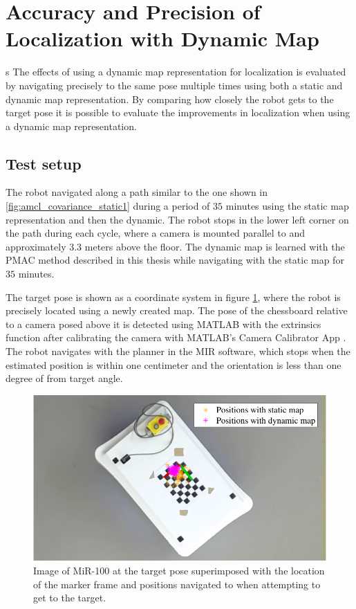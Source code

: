 \section{Accuracy and Precision of Localization with Dynamic Map}s
The effects of using a dynamic map representation for localization is evaluated by navigating precisely to the same pose multiple times using both a static and dynamic map representation.
By comparing how closely the robot gets to the target pose it is possible to evaluate the improvements in localization when using a dynamic map representation. 
\subsection{Test setup} 
The robot navigated along a path similar to the one shown in \ref{fig:amcl_covariance_static1} during a period of $35$ minutes using the static map representation and then the dynamic.
The robot stops in the lower left corner on the path during each cycle, where a camera is mounted parallel to and approximately $3.3$ meters above the floor.
The dynamic map is learned with the PMAC method described in this thesis while navigating with the static map for $35$ minutes.

The target pose is shown as a coordinate system in figure \ref{fig:mir_precision_explained}, where the robot is precisely located using a newly created map.
The pose of the chessboard relative to a camera posed above it is detected using MATLAB with the extrinsics function \cite{matlab_extrinsics} after calibrating the camera with MATLAB's Camera Calibrator App  \cite{camera_calibrator_app}.
The robot navigates with the planner in the MIR software, which stops when the estimated position is within one centimeter and the orientation is less than one degree of from target angle.

\begin{figure}
    \centering
    \includegraphics[scale=1]{chapters/evaluation/figures/mir_precision_explained}
    \caption{Image of MiR-100 at the target pose superimposed with the location of the marker frame and positions navigated to when attempting to get to the target.}
    \label{fig:mir_precision_explained}
\end{figure}

